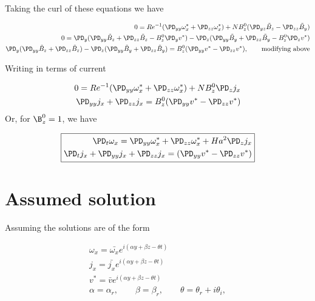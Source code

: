 \documentclass[11pt]{article}
\newcommand{\BT}{\tilde{B}}
\begin{document}
Taking the curl of these equations we have

\begin{equation}\begin{aligned}
0 = Re^{-1} (\PD_{yy} \omega_x^* + \PD_{zz} \omega_x^*) + N B_z^0 (\PD_{yz} \BT_z - \PD_{zz} \BT_y) \\
0 = \PD_y (\PD_{yy} \BT_z + \PD_{zz} \BT_z - B_z^0 \PD_y v^*) - \PD_z (\PD_{yy} \BT_y + \PD_{zz} \BT_y - B_z^0 \PD_z v^*) \\
\PD_y (\PD_{yy} \BT_z + \PD_{zz} \BT_z) - \PD_z (\PD_{yy} \BT_y + \PD_{zz} \BT_y) = B_z^0 (\PD_{yy} v^* - \PD_{zz} v^*), \qquad \text{modifying above} \\
\end{aligned}\end{equation}

Writing in terms of current

\begin{equation}\begin{aligned}
0 = Re^{-1} (\PD_{yy} \omega_x^* + \PD_{zz} \omega_x^*) + N B_z^0 \PD_{z} j_x \\
\PD_{yy} j_x + \PD_{zz} j_x = B_z^0 (\PD_{yy} v^* - \PD_{zz} v^*) \\
\end{aligned}\end{equation}
Or, for $\B_z^0 = 1$, we have

\begin{equation}\boxed{\begin{aligned}
\PD_t \omega_x = \PD_{yy} \omega_x^* + \PD_{zz} \omega_x^* + Ha^2 \PD_{z} j_x \\
\PD_t j_x + \PD_{yy} j_x + \PD_{zz} j_x = (\PD_{yy} v^* - \PD_{zz} v^*) \\
\end{aligned}}\end{equation}

\section{Assumed solution}

Assuming the solutions are of the form

\begin{equation}\begin{aligned}
\omega_x = \bar{\omega_x} e^{i(\alpha y + \beta z - \theta t)} \\
j_x      = \bar{j_x}      e^{i(\alpha y + \beta z - \theta t)} \\
v^*      = \bar{v}        e^{i(\alpha y + \beta z - \theta t)} \\
\alpha = \alpha_r, \qquad \beta = \beta_r, \qquad \theta = \theta_r + i \theta_i,  \\
\end{aligned}\end{equation}
\end{document}
